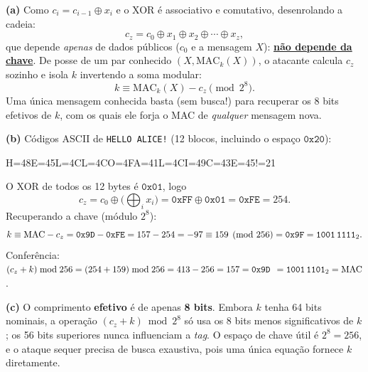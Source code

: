 \documentclass[11pt,a4paper]{article}
\newcommand{\alert}[1]{\textbf{\uline{#1}}}
\newenvironment{resposta}{%
    \begin{respostabox}
    \color{red!70!black}\sloppy
}{%
    \end{respostabox}
}
\begin{document}
\begin{resposta}
\textbf{(a)} Como $c_i = c_{i-1} \oplus x_i$ e o XOR \'{e} associativo e comutativo, desenrolando a cadeia:
\[
    c_z = c_0 \oplus x_1 \oplus x_2 \oplus \cdots \oplus x_z,
\]
que depende \emph{apenas} de dados p\'{u}blicos ($c_0$ e a mensagem $X$): \alert{n\~{a}o depende da chave}. De posse de um par conhecido $(X, \text{MAC}_k(X))$, o atacante calcula $c_z$ sozinho e isola $k$ invertendo a soma modular:
\[
    k \equiv \text{MAC}_k(X) - c_z \pmod{2^8}.
\]
Uma \'{u}nica mensagem conhecida basta (sem busca!) para recuperar os 8 bits efetivos de $k$, com os quais ele forja o MAC de \emph{qualquer} mensagem nova.

\textbf{(b)} C\'{o}digos ASCII de \texttt{HELLO ALICE!} (12 blocos, incluindo o espa\c{c}o $\texttt{0x20}$):
\begin{center}\footnotesize\ttfamily
H=48\quad E=45\quad L=4C\quad L=4C\quad O=4F\quad {}\quad A=41\quad L=4C\quad I=49\quad C=43\quad E=45\quad !=21
\end{center}
O XOR de todos os 12 bytes \'{e} $\texttt{0x01}$, logo
\[
    c_z = c_0 \oplus \big(\textstyle\bigoplus_i x_i\big) = \texttt{0xFF} \oplus \texttt{0x01} = \texttt{0xFE} = 254.
\]
Recuperando a chave (m\'{o}dulo $2^8$):
\[
    k \equiv \text{MAC} - c_z = \texttt{0x9D} - \texttt{0xFE} = 157 - 254 = -97 \equiv 159 \pmod{256} = \texttt{0x9F} = \texttt{1001\,1111}_2.
\]
Confer\^{e}ncia: $(c_z + k) \bmod 256 = (254 + 159) \bmod 256 = 413 - 256 = 157 = \texttt{0x9D}_{\phantom{2}} = \texttt{1001\,1101}_2 = \text{MAC}$. \checkmark

\textbf{(c)} O comprimento \textbf{efetivo} \'{e} de apenas \textbf{8 bits}. Embora $k$ tenha 64 bits nominais, a opera\c{c}\~{a}o $(c_z + k) \bmod 2^8$ s\'{o} usa os 8 bits menos significativos de $k$; os 56 bits superiores nunca influenciam a \textit{tag}. O espa\c{c}o de chave \'{u}til \'{e} $2^8 = 256$, e o ataque sequer precisa de busca exaustiva, pois uma \'{u}nica equa\c{c}\~{a}o fornece $k$ diretamente.
\end{resposta}
\end{document}
